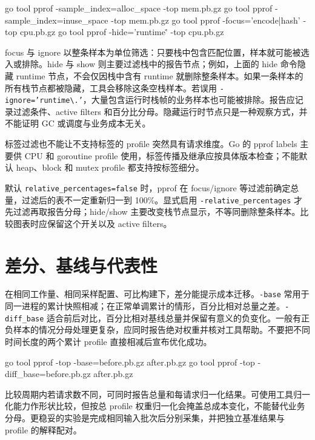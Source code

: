 \documentclass[UTF8,fontset=fandol,openany,11pt]{ctexbook}
\begin{document}
\begin{codeblock}
go tool pprof -sample_index=alloc_space -top mem.pb.gz
go tool pprof -sample_index=inuse_space -top mem.pb.gz
go tool pprof -focus='encode|hash' -top cpu.pb.gz
go tool pprof -hide='runtime\.' -top cpu.pb.gz
\end{codeblock}

focus 与 ignore 以整条样本为单位筛选：只要栈中包含匹配位置，样本就可能被选入或排除。hide 与 show 则主要过滤栈中的报告节点；例如，上面的 hide 命令隐藏 runtime 节点，不会仅因栈中含有 runtime 就删除整条样本。如果一条样本的所有栈节点都被隐藏，工具会移除这条空栈样本。若误用 \texttt{-\allowbreak{}ignore='runtime\textbackslash{}.\allowbreak{}'}，大量包含运行时栈帧的业务样本也可能被排除。报告应记录过滤条件、active filters 和百分比分母。隐藏运行时节点只是一种观察方式，并不能证明 GC 或调度与业务成本无关。

标签过滤也不能让不支持标签的 profile 突然具有请求维度。Go 的 pprof labels 主要供 CPU 和 goroutine profile 使用，标签传播及继承应按具体版本检查；不能默认 heap、block 和 mutex profile 都支持按标签细分。\cite{go-pprof}

默认 \texttt{relative\_\allowbreak{}percentages=false} 时，pprof 在 focus/ignore 等过滤前确定总量，过滤后的表不一定重新归一到 100\%。显式启用 \texttt{-\allowbreak{}relative\_\allowbreak{}percentages} 才先过滤再取报告分母；hide/show 主要改变栈节点显示，不等同删除整条样本。比较图表时应保留这个开关以及 active filters。

\section{差分、基线与代表性}
在相同工作量、相同采样配置、可比构建下，差分能提示成本迁移。\texttt{-\allowbreak{}base} 常用于同一进程的累计快照相减；在正常单调累计的情形，百分比相对总量之差。\texttt{-\allowbreak{}diff\_\allowbreak{}base} 适合前后对比，百分比相对基线总量并保留有意义的负变化。一般有正负样本的情况分母处理更复杂，应同时报告绝对权重并核对工具帮助。不要把不同时间长度的两个累计 profile 直接相减后宣布优化成功。

\begin{codeblock}
go tool pprof -top -base=before.pb.gz after.pb.gz
go tool pprof -top -diff_base=before.pb.gz after.pb.gz
\end{codeblock}

比较周期内若请求数不同，可同时报告总量和每请求归一化结果。可使用工具归一化能力作形状比较，但按总 profile 权重归一化会掩盖总成本变化，不能替代业务分母。更稳妥的实验是完成相同输入批次后分别采集，并把独立基准结果与 profile 的解释配对。
\end{document}
